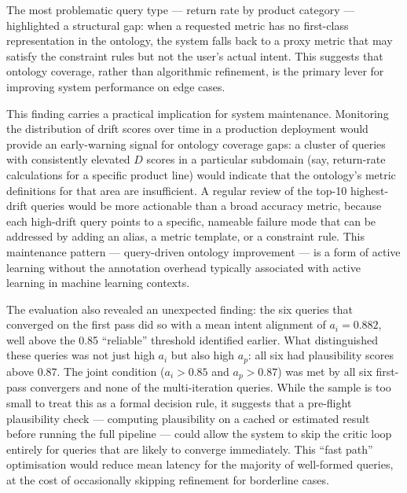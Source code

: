 \documentclass[12pt,a4paper]{report}
\begin{document}
The most problematic query type — return rate by product category — highlighted a structural gap: when a requested metric has no first-class representation in the ontology, the system falls back to a proxy metric that may satisfy the constraint rules but not the user's actual intent. This suggests that ontology coverage, rather than algorithmic refinement, is the primary lever for improving system performance on edge cases.

This finding carries a practical implication for system maintenance. Monitoring the distribution of drift scores over time in a production deployment would provide an early-warning signal for ontology coverage gaps: a cluster of queries with consistently elevated $D$ scores in a particular subdomain (say, return-rate calculations for a specific product line) would indicate that the ontology's metric definitions for that area are insufficient. A regular review of the top-10 highest-drift queries would be more actionable than a broad accuracy metric, because each high-drift query points to a specific, nameable failure mode that can be addressed by adding an alias, a metric template, or a constraint rule. This maintenance pattern — query-driven ontology improvement — is a form of active learning without the annotation overhead typically associated with active learning in machine learning contexts.

The evaluation also revealed an unexpected finding: the six queries that converged on the first pass did so with a mean intent alignment of $a_i = 0.882$, well above the 0.85 ``reliable'' threshold identified earlier. What distinguished these queries was not just high $a_i$ but also high $a_p$: all six had plausibility scores above 0.87. The joint condition ($a_i > 0.85$ and $a_p > 0.87$) was met by all six first-pass convergers and none of the multi-iteration queries. While the sample is too small to treat this as a formal decision rule, it suggests that a pre-flight plausibility check — computing plausibility on a cached or estimated result before running the full pipeline — could allow the system to skip the critic loop entirely for queries that are likely to converge immediately. This ``fast path'' optimisation would reduce mean latency for the majority of well-formed queries, at the cost of occasionally skipping refinement for borderline cases.
\end{document}
